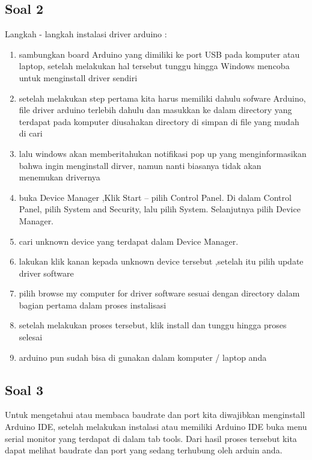 	\subsection{Soal 2}
	Langkah - langkah instalasi driver arduino :
		\begin{enumerate}
			\item sambungkan board Arduino yang dimiliki  ke port USB pada komputer atau laptop, setelah melakukan hal tersebut tunggu hingga Windows mencoba untuk menginstall driver sendiri
			\item setelah melakukan step pertama kita harus memiliki dahulu sofware Arduino, file driver arduino terlebih dahulu dan masukkan ke dalam directory yang terdapat pada komputer diusahakan directory di simpan di file yang mudah di cari
		
			
			\item lalu windows akan memberitahukan notifikasi pop up yang menginformasikan bahwa ingin menginstall dirver, namun nanti biasanya tidak akan menemukan drivernya
			
			\item buka Device Manager ,Klik Start – pilih Control Panel. Di dalam Control Panel, pilih System and Security, lalu pilih System. Selanjutnya pilih Device Manager. 
			\item cari unknown device yang terdapat dalam Device Manager.
			
			\item lakukan klik kanan kepada unknown device tersebut ,setelah itu pilih update driver software
		
			
			\item pilih browse my computer for driver software sesuai dengan directory dalam bagian pertama dalam proses instalisasi
			
			
			\item setelah melakukan proses tersebut, klik install dan tunggu hingga proses selesai
			
			
			\item arduino pun sudah bisa di gunakan dalam komputer / laptop  anda 
			
		\end{enumerate}

	\subsection{Soal 3}
	Untuk mengetahui atau membaca baudrate dan port kita diwajibkan menginstall Arduino IDE, setelah melakukan instalasi atau memiliki Arduino IDE  buka menu serial monitor yang terdapat di dalam tab tools. Dari hasil proses tersebut kita dapat melihat baudrate dan port yang sedang terhubung oleh arduin anda.

